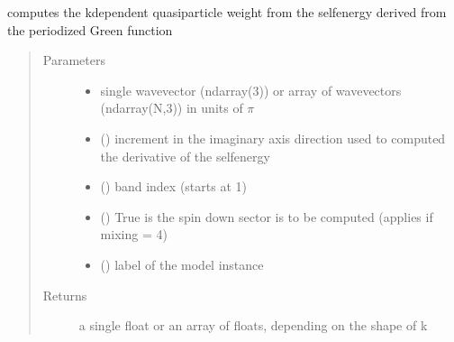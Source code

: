 \documentclass[letterpaper,10pt,english]{sphinxmanual}
\begin{document}
\begin{fulllineitems}
\label{\detokenize{functions:pyqcm.QP_weight}}
\sphinxAtStartPar
computes the k\sphinxhyphen{}dependent quasi\sphinxhyphen{}particle weight from the self\sphinxhyphen{}energy derived from the periodized Green function
\begin{quote}\begin{description}
\item[{Parameters}] \leavevmode\begin{itemize}
\item {} 
\sphinxAtStartPar
{} \textendash{} single wavevector (ndarray(3)) or array of wavevectors (ndarray(N,3)) in units of \(\pi\)

\item {} 
\sphinxAtStartPar
{} () \textendash{} increment in the imaginary axis direction used to computed the derivative of the self\sphinxhyphen{}energy

\item {} 
\sphinxAtStartPar
{} () \textendash{} band index (starts at 1)

\item {} 
\sphinxAtStartPar
{} () \textendash{} True is the spin down sector is to be computed (applies if mixing = 4)

\item {} 
\sphinxAtStartPar
{} () \textendash{} label of the model instance

\end{itemize}

\item[{Returns}] \leavevmode
\sphinxAtStartPar
a single float or an array of floats, depending on the shape of k

\end{description}\end{quote}

\end{fulllineitems}
\end{document}
